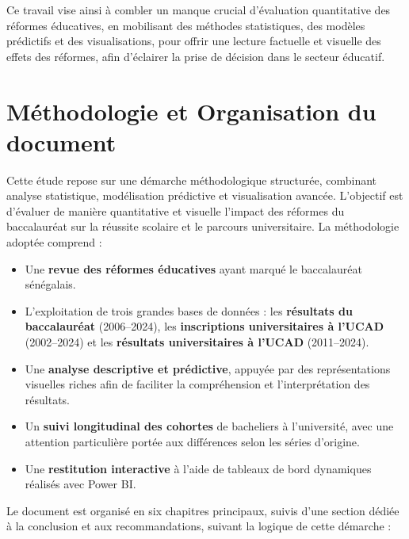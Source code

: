 Ce travail vise ainsi à combler un manque crucial d’évaluation quantitative des réformes éducatives,
en mobilisant des méthodes statistiques, des modèles prédictifs et des visualisations, pour offrir une lecture factuelle et visuelle des effets des réformes, afin d’éclairer la prise de décision dans le secteur éducatif.

\section*{Méthodologie et Organisation du document}

Cette étude repose sur une démarche méthodologique structurée, combinant analyse statistique, modélisation prédictive et visualisation avancée. L’objectif est d’évaluer de manière quantitative et visuelle l’impact des réformes du baccalauréat sur la réussite scolaire et le parcours universitaire.
\newpage
La méthodologie adoptée comprend :

\begin{itemize}
    \item Une \textbf{revue des réformes éducatives} ayant marqué le baccalauréat sénégalais.
    \item L’exploitation de trois grandes bases de données : les \textbf{résultats du baccalauréat} (2006–2024), les \textbf{inscriptions universitaires à l’UCAD} (2002–2024) et les \textbf{résultats universitaires à l’UCAD} (2011–2024).
    \item Une \textbf{analyse descriptive et prédictive}, appuyée par des représentations visuelles riches afin de faciliter la compréhension et l’interprétation des résultats.
    \item Un \textbf{suivi longitudinal des cohortes} de bacheliers à l’université, avec une attention particulière portée aux différences selon les séries d’origine.
    \item Une \textbf{restitution interactive} à l’aide de tableaux de bord dynamiques réalisés avec Power BI.
\end{itemize}


Le document est organisé en six chapitres principaux, suivis d'une section dédiée à la conclusion et aux recommandations, suivant la logique de cette démarche :

